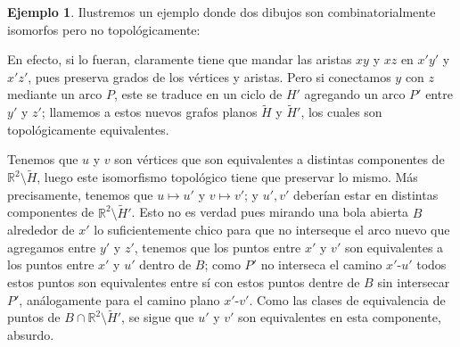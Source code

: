 \documentclass[12pt]{report}
\theoremstyle{plain}
\theoremstyle{definition}
\newtheorem{example}[theorem]{Ejemplo}
\newcommand{\reals}{\mathbb{R}}
\begin{document}
\begin{example}\label{ejemplo:dos dibujo combinatorialmente isomorfos pero no topológicamente}
Ilustremos un ejemplo donde dos dibujos son combinatorialmente isomorfos pero no topológicamente:


En efecto, si lo fueran, claramente tiene que mandar las aristas $xy$ y $x z$ en $x'y'$ y $x' z'$, pues preserva grados de los vértices y aristas. Pero si conectamos $y$ con $z$ mediante un arco $P$, este se traduce en un ciclo de $H'$ agregando un arco $P'$ entre $y'$ y $z'$; llamemos a estos nuevos grafos planos $\tilde H$ y $\tilde H'$, los cuales son topológicamente equivalentes.

Tenemos que $u$ y $v$ son vértices que son equivalentes a distintas componentes de $\reals^2 \setminus \tilde H$, luego este isomorfismo topológico tiene que preservar lo mismo. Más precisamente, tenemos que $u \mapsto u'$ y $v \mapsto v'$; y $u',v'$ deberían estar en distintas componentes de $\reals^2 \setminus \tilde H '$. Esto no es verdad pues mirando una bola abierta $B$ alrededor de $x'$ lo suficientemente chico para que no interseque el arco nuevo que agregamos entre $y'$ y $z'$, tenemos que los puntos entre $x'$ y $v'$ son equivalentes a los puntos entre $x'$ y $u'$ dentro de $B$; como $P'$ no interseca el camino $x'$-$u'$ todos estos puntos son equivalentes entre sí con estos puntos dentre de $B$ sin intersecar $P'$, análogamente para el camino plano $x'$-$v'$. Como las clases de equivalencia de puntos de $B \cap \reals^2 \setminus \tilde H'$, se sigue que $u'$ y $v'$ son equivalentes en esta componente, absurdo.

\end{example}
\end{document}
